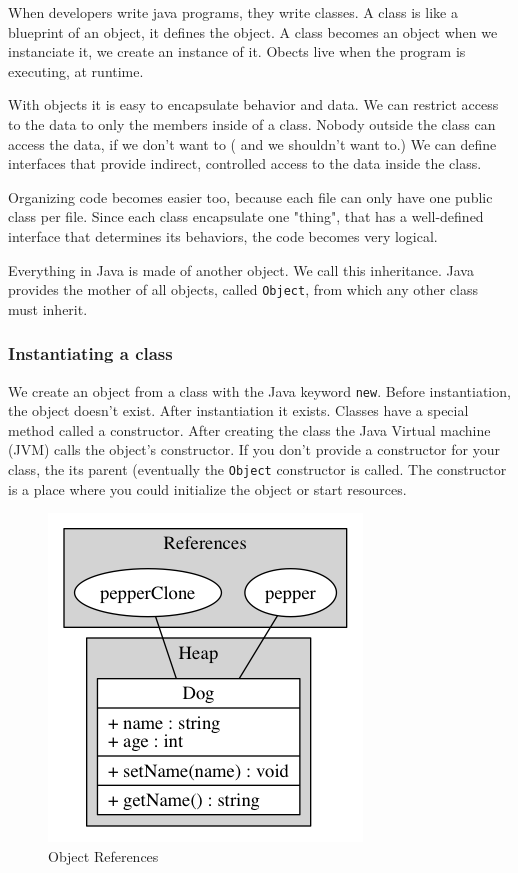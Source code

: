 When developers write java programs, they write classes. A class is like a blueprint of an object, it defines the object. A class becomes an object when we instanciate it, we create an instance of it. Obects live when the program is executing, at runtime.

With objects it is easy to encapsulate behavior and data. We can restrict access to the data to only the members inside of a class. Nobody outside the class can access the data, if we don't want to ( and we shouldn't want to.) We can define interfaces that provide indirect, controlled access to the data inside the class.

Organizing code becomes easier too, because each file can only have one  public class per file. Since each class encapsulate one "thing", that has a well-defined interface that determines its behaviors, the code becomes very logical.

Everything in Java is made of another object. We call this inheritance. Java provides the mother of all objects, called \texttt{Object}, from which any other class must inherit.

\subsubsection{Instantiating a class}
We create an object from a class with the Java keyword \texttt{new}. Before instantiation, the object doesn't exist. After instantiation it exists. Classes have a special method called a constructor. After creating the class the Java Virtual machine (JVM) calls the object's constructor. If you don't provide a constructor for your class, the its parent (eventually the \texttt{Object} constructor is called. The constructor is a place where you could initialize the object or start resources.\cite{nicholas}
\begin{figure}[H]\centering %
\includegraphics[width=0.5\linewidth]{object-reference}
\caption{Object References}
\label{fig:object-references}
\end{figure}
